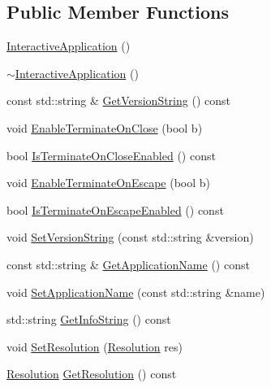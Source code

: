 \subsection*{Public Member Functions}
\begin{DoxyCompactItemize}
\item 
\hyperlink{classastu_1_1InteractiveApplication_a047e10af555ee11cddc343e327d9e204}{Interactive\+Application} ()
\item 
\hyperlink{classastu_1_1InteractiveApplication_a02c3cb22049b8565615dc458773ea2b2}{$\sim$\+Interactive\+Application} ()
\item 
const std\+::string \& \hyperlink{classastu_1_1InteractiveApplication_abb28b2c9cb4ca1de16019c0a762a48bc}{Get\+Version\+String} () const
\item 
void \hyperlink{classastu_1_1InteractiveApplication_aedaf9f10e1b285aa3afd68c0676c2be7}{Enable\+Terminate\+On\+Close} (bool b)
\item 
bool \hyperlink{classastu_1_1InteractiveApplication_ad2c49f542695e8532a8655de8b7927f7}{Is\+Terminate\+On\+Close\+Enabled} () const
\item 
void \hyperlink{classastu_1_1InteractiveApplication_abbec05442efadd10dbef963efb6d694a}{Enable\+Terminate\+On\+Escape} (bool b)
\item 
bool \hyperlink{classastu_1_1InteractiveApplication_aba7a0ca8c2becfb7b90a5fb7c8842226}{Is\+Terminate\+On\+Escape\+Enabled} () const
\item 
void \hyperlink{classastu_1_1InteractiveApplication_af5a90bd3cf0ec6c81ffe886ae30b397a}{Set\+Version\+String} (const std\+::string \&version)
\item 
const std\+::string \& \hyperlink{classastu_1_1InteractiveApplication_aad0d24125fde51bf80da87a77b58f0c2}{Get\+Application\+Name} () const
\item 
void \hyperlink{classastu_1_1InteractiveApplication_af3b504a767a4c5134338f5032e2a902a}{Set\+Application\+Name} (const std\+::string \&name)
\item 
std\+::string \hyperlink{classastu_1_1InteractiveApplication_aaee25e4b315394764152eeb1ae570f06}{Get\+Info\+String} () const
\item 
void \hyperlink{classastu_1_1InteractiveApplication_a6ced923e49633396d674674630b2c096}{Set\+Resolution} (\hyperlink{group__srv__group_ga68a91c7015964dbdea802829ae5ccb3c}{Resolution} res)
\item 
\hyperlink{group__srv__group_ga68a91c7015964dbdea802829ae5ccb3c}{Resolution} \hyperlink{classastu_1_1InteractiveApplication_a9fcba2d4fde1fc0e5f7640bcccb19ea0}{Get\+Resolution} () const

\end{DoxyCompactItemize}
